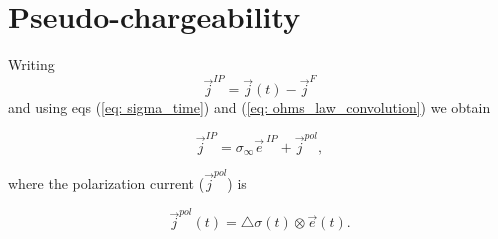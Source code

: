 \documentclass[extra,mreferee]{gji}
\newcommand{\siginf}{\sigma_\infty}
\newcommand{\dsig}{\triangle\sigma}
\renewcommand {\j}  { {\vec j} }
\newcommand {\e}  { {\vec e} }
\begin{document}
\section{Pseudo-chargeability}
\label{section: pseudo-chargeability}
Writing
\begin{equation}
  \j^{IP} = \j(t) - \j^F
  \label{eq:jIP}
\end{equation}
and using eqs (\ref{eq: sigma_time}) and  (\ref{eq: ohms_law_convolution})  we obtain
\begin{linenomath*}
\begin{equation}
  \j^{IP} = \siginf \e^{\ IP} + \j^{pol},
  \label{eq:IP_current}
\end{equation}
\end{linenomath*}
where the polarization current ($\j^{pol}$) is
\begin{linenomath*}
\begin{equation}
  \j^{pol}(t) = \dsig(t) \otimes \e(t).
  \label{eq:polarization_current}
\end{equation}
\end{linenomath*}
\end{document}
